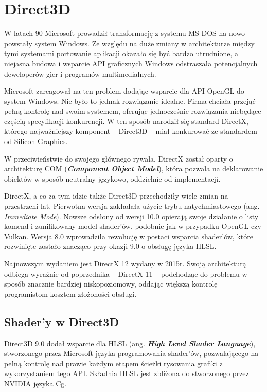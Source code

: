 \chapter{Direct3D}

W latach 90 Microsoft prowadził transformację z systemu MS-DOS na nowo
powstały system Windows. Ze względu na duże zmiany w architekturze
między tymi systemami portowanie aplikacji okazało się być bardzo
utrudnione, a niejasna budowa i wsparcie API graficznych Windows
odstraszała potencjalnych deweloperów gier i programów multimedialnych.

Microsoft zareagował na ten problem dodając wsparcie dla API OpenGL do
system Windows. Nie było to jednak rozwiązanie idealne. Firma chciała
przejąć pełną kontrolę nad swoim systemem, oferując jednocześnie
rozwiązania niebędące częścią specyfikacji konkurencji. W ten sposób
narodził się standard DirectX, którego najważniejszy komponent --
Direct3D -- miał konkurować ze standardem od Silicon Graphics.

W przeciwieństwie do swojego głównego rywala, DirectX został oparty o
architekturę COM (\emph{\textbf{Component Object Model}}), która pozwala
na deklarowanie obiektów w sposób neutralny językowo, oddzielnie od
implementacji.

DirectX, a co za tym idzie także Direct3D przechodziły wiele zmian na
przestrzeni lat. Pierwotna wersja zakładała użycie trybu
natychmiastowego (ang. \emph{Immediate Mode}). Nowsze odsłony od wersji
10.0 opierają swoje działanie o listy komend i zunifikowany model
shader'ów, podobnie jak w przypadku OpenGL czy Vulkan. Wersja 8.0
wprowadziła rewolucję w postaci wsparcia shader'ów, które rozwinięte
zostało znacząco przy okazji 9.0 o obsługę języka HLSL. \cite{wiki:direct3d:2024}

Najnowszym wydaniem jest DirectX 12 wydany w 2015r. Swoją architekturą
odbiega wyraźnie od poprzednika -- DirectX 11 -- podchodząc do problemu
w sposób znacznie bardziej niskopoziomowy, oddając większą kontrolę
programistom kosztem złożoności obsługi.


\section{Shader'y w Direct3D} %

Direct3D 9.0 dodał wsparcie dla HLSL (ang. \emph{\textbf{High Level Shader Language}}), stworzonego przez Microsoft języka programowania shader'ów, pozwalającego na pełną kontrolę nad prawie każdym etapem ścieżki rysowania grafiki z wykorzystaniem tego API. Składnia HLSL jest zbliżona do stworzonego przez NVIDIA języka Cg.

